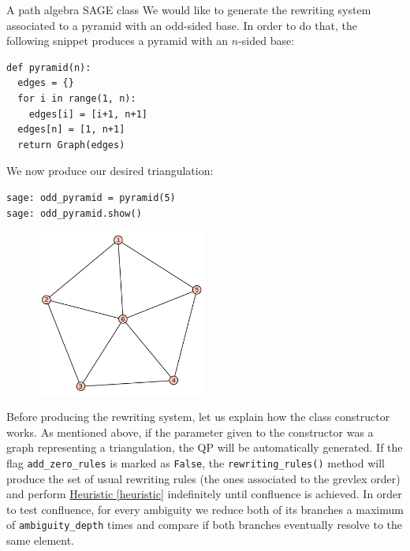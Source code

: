 \begin{chapter}{A path algebra SAGE class}
We would like to generate the rewriting system associated to a pyramid with an odd-sided base. In order to do that, the following snippet produces a pyramid with an $n$-sided base:
\begin{lstlisting}
def pyramid(n):
  edges = {}
  for i in range(1, n):
    edges[i] = [i+1, n+1]
  edges[n] = [1, n+1]
  return Graph(edges)
\end{lstlisting}
We now produce our desired triangulation:
\begin{lstlisting}
sage: odd_pyramid = pyramid(5)
sage: odd_pyramid.show()
\end{lstlisting}
\begin{figure}[h]
\centering
\includegraphics[width=0.5\textwidth]{odd_pyramid.png}
\end{figure}
Before producing the rewriting system, let us explain how the class constructor works. As mentioned above, if the parameter given to the constructor was a graph representing a triangulation, the QP will be automatically generated. If the flag \texttt{add\_zero\_rules} is marked as \texttt{False}, the \texttt{rewriting\_rules()} method will produce the set of usual rewriting rules (the ones associated to the grevlex order) and perform \hyperref[heuristic]{Heuristic \ref*{heuristic}} indefinitely until confluence is achieved. In order to test confluence, for every ambiguity we reduce both of its branches a maximum of \texttt{ambiguity\_depth} times and compare if both branches eventually resolve to the same element.


\end{chapter}
